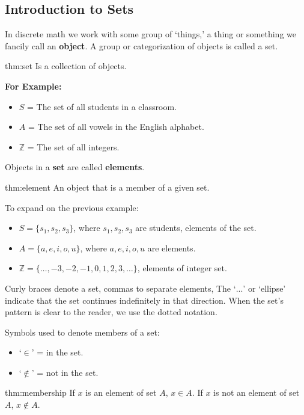 \subsection{Introduction to Sets}
\hspace*{1em}
In discrete math we work with some group of `things,' a thing or something
we fancily call an \textbf{object}. A group or categorization of objects is called a set.

\begin{theo}[a Set]{thm:set}
    Is a collection of objects.
\end{theo}

\noindent
\textbf{For Example:}
\begin{itemize}
    \item $S$ = The set of all students in a classroom.
    \item $A$ = The set of all vowels in the English alphabet.
    \item $\mathbb{Z}$ = The set of all integers.

\end{itemize}
Objects in a \textbf{set} are called \textbf{elements}.

\begin{theo}[an Element]{thm:element}
    An object that is a member of a given set.
\end{theo}

\noindent
To expand on the previous example:
\begin{itemize}
    \item $S = \{s_1, s_2, s_3\}$, where $s_1, s_2, s_3$ are students, elements of the set.
    \item $A = \{a, e, i, o, u\}$, where $a, e, i, o, u$ are elements.
    \item $\mathbb{Z} = \{\ldots, -3, -2, -1, 0, 1, 2, 3, \ldots\}$, elements of integer set.
\end{itemize}
Curly braces denote a set, commas to separate elements,
The `$...$' or `ellipse' indicate that the set continues indefinitely in that direction.
When the set's pattern is clear to the reader, we use the dotted notation.

\newpage
\noindent
Symbols used to denote members of a set:
\begin{itemize}
    \item `$\in$' = in the set.
    \item `$\notin$' = not in the set.
\end{itemize}

\begin{theo}[Membership]{thm:membership}
    If $x$ is an element of set $A$, $x \in A$.
    If $x$ is not an element of set $A$, $x \notin A$.
\end{theo}

